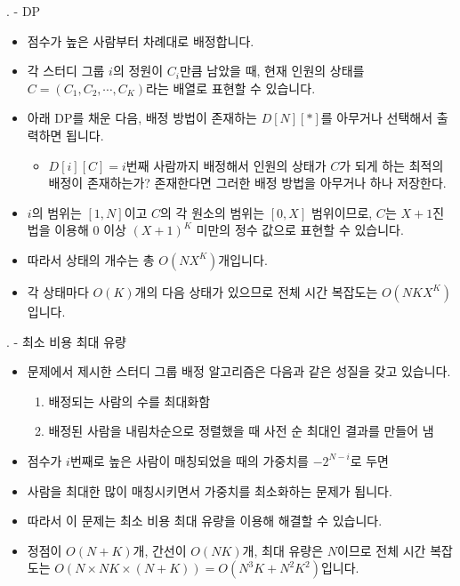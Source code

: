 \begin{frame}{\probno{}. \probtitle{} - DP}
    \begin{itemize}
        \item 점수가 높은 사람부터 차례대로 배정합니다.
        \item 각 스터디 그룹 $i$의 정원이 $C_i$만큼 남았을 때, 현재 인원의 상태를 $C = (C_1, C_2, \cdots, C_K)$라는 배열로 표현할 수 있습니다.
        \item 아래 DP를 채운 다음, 배정 방법이 존재하는 $D[N][\ast]$를 아무거나 선택해서 출력하면 됩니다.
        \begin{itemize}
            \item $D[i][C] = i$번째 사람까지 배정해서 인원의 상태가 $C$가 되게 하는 최적의 배정이 존재하는가? 존재한다면 그러한 배정 방법을 아무거나 하나 저장한다.
        \end{itemize}
        \item $i$의 범위는 $[1, N]$이고 $C$의 각 원소의 범위는 $[0, X]$ 범위이므로, $C$는 $X+1$진법을 이용해 $0$ 이상 $(X+1)^K$ 미만의 정수 값으로 표현할 수 있습니다.
        \item 따라서 상태의 개수는 총 $O(NX^K)$개입니다.
        \item 각 상태마다 $O(K)$개의 다음 상태가 있으므로 전체 시간 복잡도는 $O(NKX^K)$ 입니다.
        
    \end{itemize}
\end{frame}

\begin{frame}{\probno{}. \probtitle{} - 최소 비용 최대 유량}
    \begin{itemize}
        \item 문제에서 제시한 스터디 그룹 배정 알고리즘은 다음과 같은 성질을 갖고 있습니다.

        \begin{enumerate}
            \item 배정되는 사람의 수를 최대화함
            \item 배정된 사람을 내림차순으로 정렬했을 때 사전 순 최대인 결과를 만들어 냄
        \end{enumerate}
        \vspace{3mm}
        \item 점수가 $i$번째로 높은 사람이 매칭되었을 때의 가중치를 $-2^{N-i}$로 두면
        \item 사람을 최대한 많이 매칭시키면서 가중치를 최소화하는 문제가 됩니다.
        \item 따라서 이 문제는 최소 비용 최대 유량을 이용해 해결할 수 있습니다.
        \item 정점이 $O(N+K)$개, 간선이 $O(NK)$개, 최대 유량은 $N$이므로 전체 시간 복잡도는 $O(N \times NK \times (N+K)) = O(N^3K + N^2K^2)$입니다.
    \end{itemize}
\end{frame}

